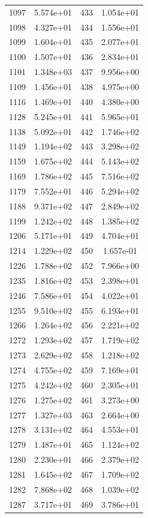 \documentclass[12pt]{article}
\begin{document}
\begin{longtable}{@{}cccc@{}}
1097 & 5.574e+01 & 433 & 1.054e+01 \\
1098 & 4.327e+01 & 434 & 1.556e+01 \\
1099 & 1.604e+01 & 435 & 2.077e+01 \\
1100 & 1.507e+01 & 436 & 2.834e+01 \\
1101 & 1.348e+03 & 437 & 9.956e+00 \\
1109 & 1.456e+01 & 438 & 4.975e+00 \\
1116 & 1.469e+01 & 440 & 4.380e+00 \\
1128 & 5.245e+01 & 441 & 5.965e+01 \\
1138 & 5.092e+01 & 442 & 1.746e+02 \\
1149 & 1.194e+02 & 443 & 3.298e+02 \\
1159 & 1.675e+02 & 444 & 5.143e+02 \\
1169 & 1.786e+02 & 445 & 7.516e+02 \\
1179 & 7.552e+01 & 446 & 5.294e+02 \\
1188 & 9.371e+02 & 447 & 2.849e+02 \\
1199 & 1.242e+02 & 448 & 1.385e+02 \\
1206 & 5.171e+01 & 449 & 4.704e+01 \\
1214 & 1.229e+02 & 450 & 1.657e-01 \\
1226 & 1.788e+02 & 452 & 7.966e+00 \\
1235 & 1.816e+02 & 453 & 2.398e+01 \\
1246 & 7.586e+01 & 454 & 4.022e+01 \\
1255 & 9.510e+02 & 455 & 6.193e+01 \\
1266 & 1.264e+02 & 456 & 2.221e+02 \\
1272 & 1.293e+02 & 457 & 1.719e+02 \\
1273 & 2.629e+02 & 458 & 1.218e+02 \\
1274 & 4.755e+02 & 459 & 7.169e+01 \\
1275 & 4.242e+02 & 460 & 2.305e+01 \\
1276 & 1.275e+02 & 461 & 3.273e+00 \\
1277 & 1.327e+03 & 463 & 2.664e+00 \\
1278 & 3.131e+02 & 464 & 4.553e+01 \\
1279 & 1.487e+01 & 465 & 1.124e+02 \\
1280 & 2.230e+01 & 466 & 2.379e+02 \\
1281 & 1.645e+02 & 467 & 1.709e+02 \\
1282 & 7.868e+02 & 468 & 1.039e+02 \\
1287 & 3.717e+01 & 469 & 3.786e+01 \\

\end{longtable}
\end{document}
